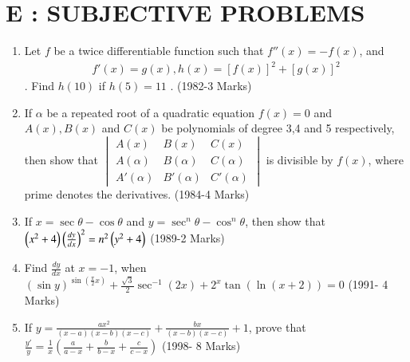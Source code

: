 \documentclass[journal,,12pt,twocolumn]{IEEEtran}
\theoremstyle{remark}
\begin{document}
\section*{E : SUBJECTIVE PROBLEMS}
\begin{enumerate}
\item Let $f$ be a twice differentiable function such that 
$f''(x)=-f(x)$, and \begin{align*}f'(x)=g(x) , h(x)=[f(x)]^2+[g(x)]^2\end{align*}. Find $h(10)$ if $h(5)=11$ .
\hfill{(1982-3 Marks)}
\item If $\alpha$ be a repeated root of a quadratic equation $f(x)=0$ and $A(x),B(x)$ and $C(x)$ be polynomials of degree 3,4 and 5 respectively, then show that $\begin{vmatrix}
A(x) & B(x) & C(x) \\
A(\alpha) & B(\alpha) & C(\alpha) \\
A'(\alpha) & B'(\alpha) & C'(\alpha) 
\end{vmatrix}$ 
is divisible by $f(x)$, where prime denotes the derivatives.
\hfill{(1984-4 Marks)}
\item If $x=\sec{\theta}-\cos{\theta}$ and $y=\sec^n{\theta}-\cos^n{\theta}$, then show that $ \left(x^2 + 4\right) \left(\frac{dy}{dx}\right)^2=n^2 \left(y^2+4\right)$ 
\hfill{(1989-2 Marks)}
\item Find $\frac{dy}{dx}$ at $x=-1$, when $(\sin{y})^{\sin(\frac{\pi}{2}x)} + \frac{\sqrt{3}}{2}\sec^{-1}{(2x)} + 2^x\tan{(\ln{(x+2)})} = 0 $
\hfill{(1991- 4 Marks)}
\item If $y = \frac{ax^2}{(x-a)(x-b)(x-c)}+\frac{bx}{(x-b)(x-c)}+1$, prove that $\frac{y'}{y}=\frac{1}{x}(\frac{a}{a-x}+\frac{b}{b-x}+\frac{c}{c-x})$
\hfill{(1998- 8 Marks)}
\end{enumerate}
\end{document}
